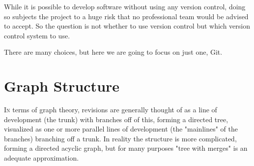 \documentclass[twoside]{article}
\begin{document}
\begin{multicols}{2}
While it is possible to develop software without using any version control, doing so subjects the project to a huge risk that no professional team would be advised to accept. So the question is not whether to use version control but which version control system to use.

There are many choices, but here we are going to focus on just one, Git.




\section{Graph Structure}

\lettrine[nindent=0em,lines=3]{I}n terms of graph theory, revisions are generally thought of as a line of development (the trunk) with branches off of this, forming a directed tree, visualized as one or more parallel lines of development (the "mainlines" of the branches) branching off a trunk. In reality the structure is more complicated, forming a directed acyclic graph, but for many purposes "tree with merges" is an adequate approximation.


\end{multicols}
\end{document}
